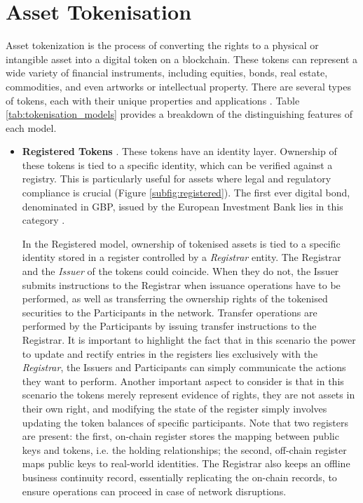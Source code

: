 \section{Asset Tokenisation}
\label{sec:asset_tokenisation}
Asset tokenization is the process of converting the rights to a physical or intangible asset into a digital token on a blockchain. These tokens can represent a wide variety of financial instruments, including equities, bonds, real estate, commodities, and even artworks or intellectual property. There are several types of tokens, each with their unique properties and applications \cite{isda_tokenisation_models}. Table \ref{tab:tokenisation_models} provides a breakdown of the distinguishing features of each model.

\begin{itemize}

    \item \textbf{Registered Tokens} \citep{registered_tokens}. These tokens have an identity layer. Ownership of these tokens is tied to a specific identity, which can be verified against a registry. This is particularly useful for assets where legal and regulatory compliance is crucial (Figure \ref{subfig:registered}). The first ever digital bond, denominated in GBP, issued by the European Investment Bank lies in this category \citep{eib_bond}.

    In the Registered model, ownership of tokenised assets is tied to a specific identity stored in a register controlled by a \textit{Registrar} entity. The Registrar and the \textit{Issuer} of the tokens could coincide. When they do not, the Issuer submits instructions to the Registrar when issuance operations have to be performed, as well as transferring the ownership rights of the tokenised securities to the Participants in the network. Transfer operations are performed by the Participants by issuing transfer instructions to the Registrar. It is important to highlight the fact that in this scenario the power to update and rectify entries in the registers lies exclusively with the \textit{Registrar}, the Issuers and Participants can simply communicate the actions they want to perform. Another important aspect to consider is that in this scenario the tokens merely represent evidence of rights, they are not assets in their own right, and modifying the state of the register simply involves updating the token balances of specific participants. Note that two registers are present: the first, on-chain register stores the mapping between public keys and tokens, i.e. the holding relationships; the second, off-chain register maps public keys to real-world identities. The Registrar also keeps an offline business continuity record, essentially replicating the on-chain records, to ensure operations can proceed in case of network disruptions.
    

\end{itemize}
